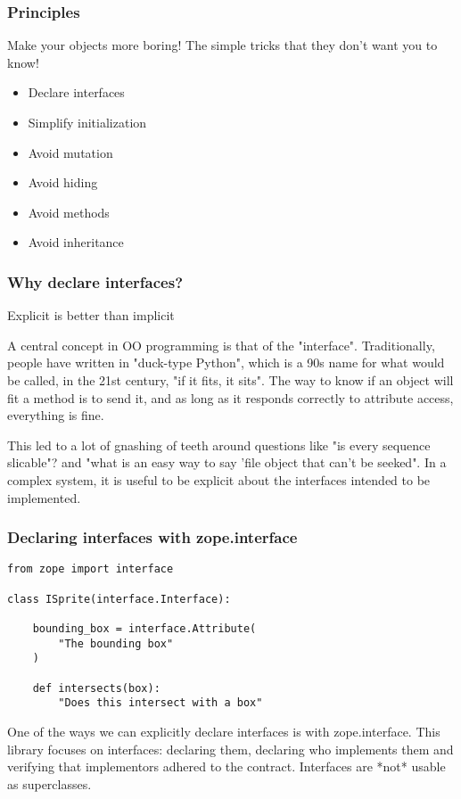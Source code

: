 \begin{frame}[fragile]
\frametitle{Principles}

Make your objects more boring!
The simple tricks that they don't want you to know!

\begin{itemize}
\item Declare interfaces\pause 
\item Simplify initialization\pause
\item Avoid mutation\pause
\item Avoid hiding\pause
\item Avoid methods\pause
\item Avoid inheritance
\end{itemize}

\end{frame}

\begin{frame}[fragile]
\frametitle{Why declare interfaces?}

Explicit is better than implicit
\end{frame}

A central concept in OO programming is that of the "interface".
Traditionally,
people have written in "duck-type Python",
which is a 90s name for what would be called,
in the 21st century,
"if it fits, it sits".
The way to know if an object will fit a method is to send it,
and as long as it responds correctly to attribute access,
everything is fine.

This led to a lot of gnashing of teeth around questions like
"is every sequence slicable"?
and
"what is an easy way to say 'file object that can't be seeked".
In a complex system,
it is useful to be explicit about the interfaces intended to be
implemented.

\begin{frame}[fragile]
\frametitle{Declaring interfaces with zope.interface}

\begin{lstlisting}
from zope import interface

class ISprite(interface.Interface):

    bounding_box = interface.Attribute(
        "The bounding box"
    )

    def intersects(box):
        "Does this intersect with a box"
\end{lstlisting}

\end{frame}

One of the ways we can explicitly declare interfaces is with
zope.interface.
This library focuses on interfaces:
declaring them,
declaring who implements them
and verifying that implementors adhered to the contract.
Interfaces are
*not*
usable as superclasses.

